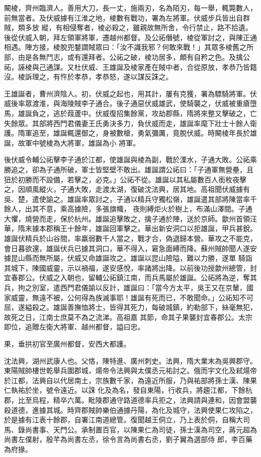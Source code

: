 \begin{pinyinscope}
 闞棱，齊州臨濟人。善用大刀，長一丈，施兩刃，名為陌刃，每一舉，輒斃數人，前無當者。及伏威據有江淮之地，棱數有戰功，署為左將軍。伏威步兵皆出自群賊，類多放
 縱，有相侵奪者，棱必殺之，雖親故無所舍，令行禁止，路不拾遺。後從伏威入朝，拜左領軍將軍，遷越州都督。及公祏僭號，棱從軍討之，與陳正通相遇。陣方接，棱脫兜鍪謂賊眾曰：「汝不識我邪？何敢來戰！」其眾多棱舊之所部，由是各無鬥志，或有還拜者。公祏之破，棱功居多，頗有自矜之色。及擒公祏，誣棱與己通謀。又杜伏威、王雄誕及棱家產在賊中者，合從原放，孝恭乃皆籍沒。棱訴理之，有忤於孝恭，孝恭怒，遂以謀反誅之。



 王雄誕者，曹州濟陰人。初，伏威之起也，用其計，屢有克獲，署為驃騎將軍。伏威後率眾渡淮，與海陵賊李子通合。後子通惡伏威雄武，使騎襲之，伏威被重瘡墮馬，雄誕負之，逃於葭蘆中。伏威復招集餘黨，攻劫郡縣，隋將來整又擊破之，亡失餘眾。其部將西門君儀妻王氏勇決多力，負伏威而走，雄誕率麾下壯士十餘人衛護。隋軍追至，雄誕輒還御之，身被數槍，勇氣彌厲，竟脫伏威。時闞棱年長於雄誕，故軍中號棱為大將軍，雄誕為小
 將軍。



 後伏威令輔公祏擊李子通於江都，使雄誕與棱為副，戰於溧水，子通大敗。公祏乘勝追之，卻為子通所破，軍士皆堅壁不敢出。雄誕謂公祏曰：「子通軍無營壘，且狃於初勝而不設備，若擊之，必克。」公祏不從。雄誕以其私屬數百人銜枚夜擊之，因順風縱火，子通大敗，走渡太湖，復破沈法興，居其地。高祖聞伏威據有吳、楚，遣使諭之。雄誕率眾討之，子通以精兵守獨松嶺，雄誕遣其部將陳當率千餘人，出其不意，乘高據險，多張旗幟，
 夜則縛炬火於樹上，布滿山澤間。子通大懼，燒營而走，保於杭州。雄誕追擊敗之，擒子通於陣，送於京師。歙州首領汪華，隋末據本郡稱王十餘年，雄誕回軍擊之。華出新安洞口以拒雄誕，甲兵甚銳。雄誕伏精兵於山谷間，率羸弱數千人當之，戰才合，偽退歸本營。華攻之不能克，會日暮欲還，雄誕伏兵已據其洞口，華不得入，窘急面縛而降。蘇州賊帥聞人遂安據昆山縣而無所屬，伏威又命雄誕攻之。雄誕以昆山險隘，難以力勝，遂單
 騎詣其城下，陳國威靈，示以禍福，遂安感悅，率諸將出降。以前後功授歙州總管，封宜春郡公。伏威之入朝也，留輔公祏鎮江南，而兵馬屬於雄誕。公祏將為逆，奪其兵，拘之別室，遣西門君儀諭以反計，雄誕曰：「當今方太平，吳王又在京輦，國家威靈，無遠不被，公何得為族滅事耶！雄誕有死而已，不敢聞命。」公祏知不可屈，遂縊殺之。雄誕善撫恤將士，皆得其死力，每破城鎮，約勒部下，絲毫無犯，故死之日，江南士庶莫不為之流涕。高祖嘉
 其節，命其子果襲封宜春郡公。太宗即位，追贈左衛大將軍、越州都督，謚曰忠。



 果，垂拱初官至廣州都督，安西大都護。



 沈法興，湖州武康人也。父恪，陳特進、廣州刺史。法興，隋大業末為吳興郡守。東陽賊帥樓世乾舉兵圍郡城，煬帝令法興與太僕丞元祐討之。俄而宇文化及弒煬帝於江都，法興自以代居南土，宗族數千家，為遠近所服，乃與祐部將孫士漢、陳果仁執祐於坐，號令遠近。以誅
 化及為名，發自東陽，行收兵，將趨江都，下餘杭郡，比至烏程，精卒六萬。毗陵郡通守路道德率兵拒之，法興請與連和，因會盟襲殺道德，進據其城。時齊郡賊帥樂伯通據丹陽，為化及城守，法興使果仁攻陷之，於是據有江表十餘郡，自署江南道總管。復聞越王侗立，乃上表於侗，自稱大司馬、錄尚書事、天門公。承制置百官，以陳果仁為司徒，孫士漢為司空，蔣元超為尚書左僕射，殷芊為尚書左丞，徐令言為尚書右丞，劉子翼為選部侍
 郎，李百藥為府掾。




\end{pinyinscope}
